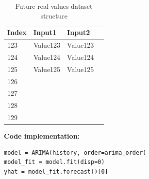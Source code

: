 \begin{table}[ht] 
    \centering 
    \begin{tabular}{ | l | l | l | p{5cm} |}
        \hline
        Index & Input1 & Input2 		\\ \hline
          	123 & Value123 & Value123 	\\ \hline
          	124 & Value124 & Value124 	\\ \hline
          	125 & Value125 & Value125 	\\ \hline
          	126 & 	&					\\ \hline
          	127 & 	&					\\ \hline
          	128 & 	&					\\ \hline
 			129 & 	&					\\ \hline
    \end{tabular}
    \caption{Future real values dataset structure}
    \label{table: pred_real_values} 
\end{table} 

\newpage

\textbf{Code implementation:}\\
\begin{lstlisting}
model = ARIMA(history, order=arima_order)
model_fit = model.fit(disp=0)
yhat = model_fit.forecast()[0]
\end{lstlisting}


